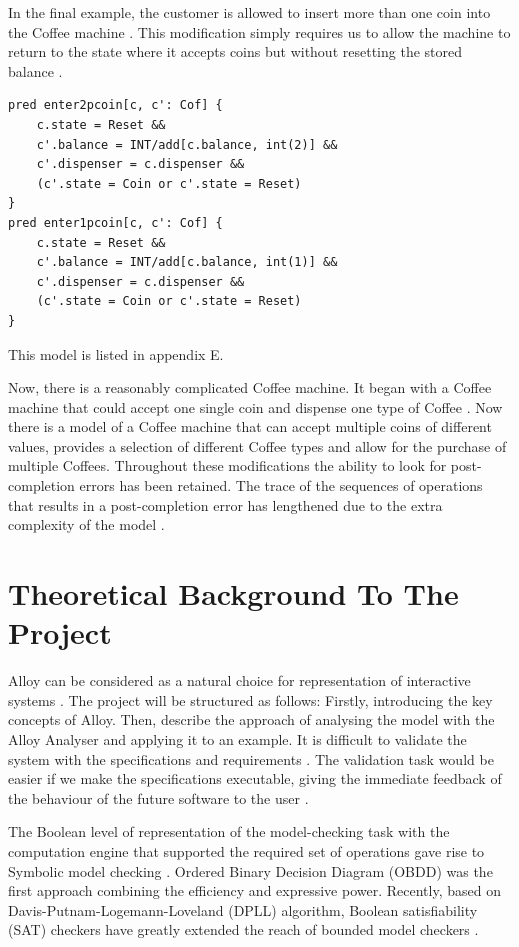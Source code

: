 \documentclass[a4paper,10pt]{report}
\begin{document}
In the final example, the customer is allowed to insert more than one coin into the Coffee machine \cite{Boyatt}. This modification simply requires us to allow the machine to return to the state where it accepts coins but without resetting the stored balance \cite{Boyatt}.

\begin{verbatim}
pred enter2pcoin[c, c': Cof] {
	c.state = Reset &&
	c'.balance = INT/add[c.balance, int(2)] &&
	c'.dispenser = c.dispenser &&
	(c'.state = Coin or c'.state = Reset)
}
pred enter1pcoin[c, c': Cof] {
	c.state = Reset &&
	c'.balance = INT/add[c.balance, int(1)] &&
	c'.dispenser = c.dispenser &&
	(c'.state = Coin or c'.state = Reset)
}
\end{verbatim}

This model is listed in appendix E.

Now, there is a reasonably complicated Coffee machine. It began with a Coffee machine that could accept one single coin and dispense one type of Coffee \cite{Boyatt}. Now there is a model of a Coffee machine that can accept multiple coins of different values, provides a selection of different Coffee types and allow for the purchase of multiple Coffees. Throughout these modifications the ability to look for post-completion errors has been retained. The trace of the sequences of operations that results in a post-completion error has lengthened due to the extra complexity of the model \cite{Boyatt}.
 
\chapter{Theoretical Background To The Project}
Alloy can be considered as a natural choice for representation of interactive systems \cite{P.Curson}.  The project will be structured as follows:
 Firstly, introducing the key concepts of Alloy. Then, describe the approach of analysing the model with the Alloy Analyser and applying it to an example.
It is difficult to validate the system with the specifications and requirements \cite{Boyatt}. The     validation task would be easier if we make the specifications executable, giving the immediate feedback of the behaviour of the future software to the user \cite{Boyatt}.

The Boolean level of representation of the model-checking task with the computation engine that supported the required set of operations gave rise to Symbolic model checking \cite{Bryant1986}. Ordered Binary Decision Diagram (OBDD) was the first approach combining the efficiency and expressive power. Recently, based on Davis-Putnam-Logemann-Loveland (DPLL) algorithm, Boolean satisfiability (SAT) checkers have greatly extended the reach of bounded model checkers \cite{Bryant1986}.
\end{document}
